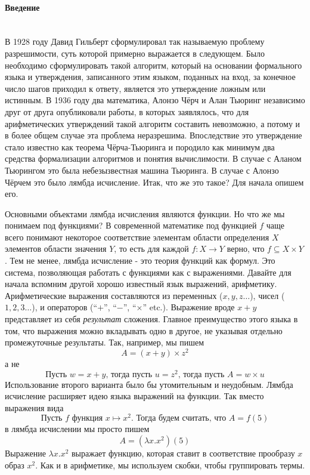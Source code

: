 \documentclass[lambda.tex]{subfiles}
\begin{document}
\paragraph{Введение} ~\\

В 1928 году Давид Гильберт сформулировал так называемую проблему разрешимости, суть которой примерно выражается в следующем. Было необходимо сформулировать такой алгоритм, который на основании формального языка и утверждения, записанного этим языком, поданных на вход, за конечное число шагов приходил к ответу, является это утверждение ложным или истинным. В 1936 году два математика, Алонзо Чёрч и Алан Тьюринг независимо друг от друга опубликовали работы, в которых заявлялось, что для арифметических утверждений такой алгоритм составить невозможно, а потому и в более общем случае эта проблема неразрешима. Впоследствие это утверждение стало известно как теорема Чёрча-Тьюринга и породило как минимум два средства формализации алгоритмов и понятия вычислимости. В случае с Аланом Тьюрингом это была небезызвестная машина Тьюринга. В случае с Алонзо Чёрчем это было лямбда исчисление. Итак, что же это такое? Для начала опишем его.

Основными объектами лямбда исчисления являются функции. Но что же мы понимаем под функциями? В современной математике под функцией $f$ чаще всего понимают некоторое соответствие элементам области определения $X$ элементов области значения $Y$, то есть для каждой $f:X \rightarrow Y$ верно, что $f \subseteq X \times Y$. Тем не менее, лямбда исчисление - это теория функций как формул. Это система, позволяющая работать с функциями как с выражениями.
Давайте для начала вспомним другой хорошо известный язык выражений, арифметику. Арифметические выражения составляются из переменных ($x,y,z\dots$), чисел ($1,2,3\dots$), и операторов (``$+$'', ``$-$'', ``$\times$'' etc.). Выражение вроде $x+y$ представляет из себя \emph{результат} сложения. Главное преимущество этого языка в том, что выражения можно вкладывать одно в другое, не указывая отдельно промежуточные результаты. Так, например, мы пишем
\[A=(x+y) \times z^2\]
а не
\[\text{Пусть }w=x+y\text{, тогда пусть }u=z^2 \text{, тогда пусть }A=w \times u\]
Использование второго варианта было бы утомительным и неудобным.
Лямбда исчисление расширяет идею языка выражений на функции. Так вместо выражения вида
\[\text{Пусть } f \text{ функция } x \mapsto x^2 \text{. Тогда будем считать, что } A=f(5)\]
в лямбда исчислении мы просто пишем
\[A=(\lambda x.x^2)(5)\]
Выражение $\lambda x.x^2$ выражает функцию, которая ставит в соответствие прообразу $x$ образ $x^2$. Как и в арифметике, мы используем скобки, чтобы группировать термы.
\end{document}
